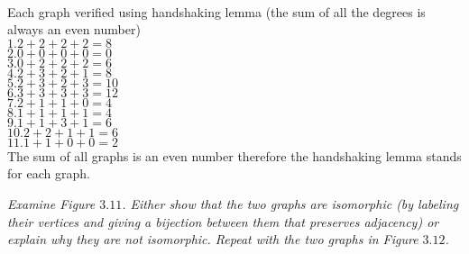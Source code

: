 \documentclass[12pt,letterpaper]{exam}
\begin{document}
\begin{questions}
\\
Each graph verified using handshaking lemma (the sum of all the degrees is always an even number)
\\
$1. 2+2+2+2=8$ 
\\
$2. 0+0+0+0=0$
\\
$3. 0+2+2+2=6$
\\
$4. 2+3+2+1=8$
\\
$5. 2+3+2+3=10$
\\
$6. 3+3+3+3=12$
\\
$7. 2+1+1+0=4$
\\
$8. 1+1+1+1=4$
\\
$9. 1+1+3+1=6$
\\
$10. 2+2+1+1=6$
\\
$11. 1+1+0+0=2$
\\
The sum of all graphs is an even number therefore the handshaking lemma stands for each graph.


\question[3.10] 
\emph{Examine Figure $3.11$. Either show that the two graphs are isomorphic (by labeling their vertices and giving a bijection between them that preserves adjacency) or explain why they are not isomorphic. Repeat with the two graphs in Figure $3.12$.}


\end{questions}
\end{document}
